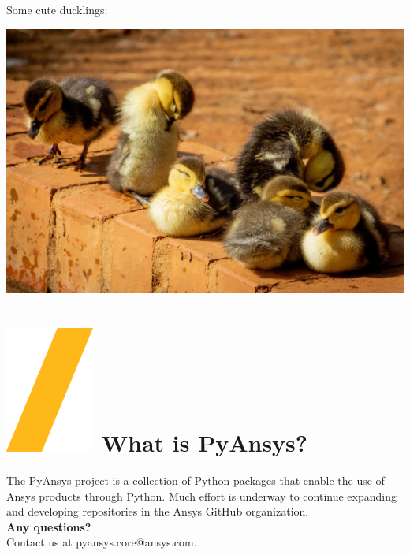 \documentclass[a0paper,fleqn]{src/betterposter}
\begin{document}
{Some cute ducklings:
\begin{center}
\includegraphics[width=\textwidth]{img/example/ducklings}
\end{center}

\section{\includegraphics[height=\fontcharht\font`\S]{img/general/slash.png} What is PyAnsys?}
The PyAnsys project is a collection of Python packages that enable the use of Ansys products through Python.
Much effort is underway to continue expanding and developing repositories in the Ansys GitHub organization.
\\
\newline
\textbf{Any questions?} \\Contact us at pyansys.core@ansys.com.
\\
\newline

}
\end{document}

